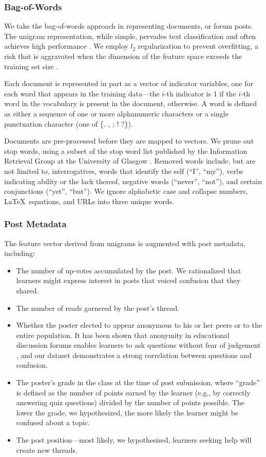\documentclass{edm_template}
\newcommand{\squishlist}{
 \begin{list}{$\bullet$}
 {
  \setlength{\itemsep}{0pt}
  \setlength{\parsep}{3pt}
  \setlength{\topsep}{3pt}
  \setlength{\partopsep}{0pt}
  \setlength{\leftmargin}{1.5em}
  \setlength{\labelwidth}{1em}
  \setlength{\labelsep}{0.5em} } }
\newcommand{\squishend}{
  \end{list}  }
\begin{document}
\subsubsection{Bag-of-Words}
We take the bag-of-words approach in representing documents, or forum posts. The unigram representation, while simple, pervades text classification and often achieves high performance \cite{boulis2005text}. We employ $l_{2}$ regularization to prevent overfitting, a risk that is aggravated when the dimension of the feature space exceeds the training set size \cite{Ng:2004:FSL:1015330.1015435}.

Each document is represented in part as a vector of indicator variables, one for each word that appears in the training data---the $i$-th indicator is 1 if the $i$-th word in the vocabulary is present in the document, otherwise. A word is defined as either a sequence of one or more alphanumeric characters or a single punctuation character (one of \{. , ; ! ?\}). 

Documents are pre-processed before they are mapped to vectors. We prune out stop words, using a subset of the stop word list published by the Information Retrieval Group at the University of Glasgow \cite{glasgow}. Removed words include, but are not limited to, interrogatives, words that identify the self (``I'', ``my''), verbs indicating ability or the lack thereof, negative words (``never'', ``not''), and certain conjunctions (``yet'', ``but''). We ignore alphabetic case and collapse numbers, \LaTeX\ equations, and URLs into three unique words.


\subsubsection{Post Metadata}
The feature vector derived from unigrams is augmented with post metadata, including: 
\vspace{-15pt}
\begin{itemize}
\setlength\itemsep{0.05em}
       \item The number of up-votes accumulated by the post. We rationalized that learners might express interest in posts that voiced confusion that they shared. 
       \item The number of reads garnered by the post's thread.
       \item Whether the poster elected to appear anonymous to his or her peers or to the entire population. It has been shown that anonymity in educational discussion forums enables learners to ask questions without fear of judgement \cite{freeman2004student}, and our dataset demonstrates a strong correlation between questions and confusion.
       \item The poster's grade in the class at the time of post submission, where ``grade'' is defined as the number of points earned by the learner (e.g., by correctly answering quiz questions) divided by the number of points possible. The lower the grade, we hypothesized, the more likely the learner might be confused about a topic.
       \item The post position---most likely, we hypothesized, learners seeking help will create new threads.
\end{itemize}
\end{document}
